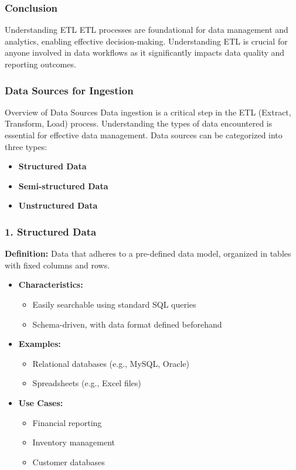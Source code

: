 \documentclass[aspectratio=169]{beamer}
\begin{document}
\begin{frame}[fragile]
    \frametitle{Conclusion}
    \begin{block}{Understanding ETL}
        ETL processes are foundational for data management and analytics, enabling effective decision-making. Understanding ETL is crucial for anyone involved in data workflows as it significantly impacts data quality and reporting outcomes.
    \end{block}
\end{frame}

\begin{frame}[fragile]
  \frametitle{Data Sources for Ingestion}
  \begin{block}{Overview of Data Sources}
    Data ingestion is a critical step in the ETL (Extract, Transform, Load) process. Understanding the types of data encountered is essential for effective data management. Data sources can be categorized into three types:
    \begin{itemize}
      \item \textbf{Structured Data}
      \item \textbf{Semi-structured Data}
      \item \textbf{Unstructured Data}
    \end{itemize}
  \end{block}
\end{frame}

\begin{frame}[fragile]
  \frametitle{1. Structured Data}
  \textbf{Definition:} Data that adheres to a pre-defined data model, organized in tables with fixed columns and rows.

  \begin{itemize}
    \item \textbf{Characteristics:}
      \begin{itemize}
        \item Easily searchable using standard SQL queries
        \item Schema-driven, with data format defined beforehand
      \end{itemize}
    
    \item \textbf{Examples:}
      \begin{itemize}
        \item Relational databases (e.g., MySQL, Oracle)
        \item Spreadsheets (e.g., Excel files)
      \end{itemize}
    
    \item \textbf{Use Cases:}
      \begin{itemize}
        \item Financial reporting
        \item Inventory management
        \item Customer databases
      \end{itemize}
  \end{itemize}
\end{frame}
\end{document}
